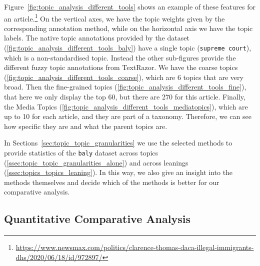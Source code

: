 Figure~\ref{fig:topic_analysis_different_tools} shows an example of these features for an article.\footnote{\url{https://www.newsmax.com/politics/clarence-thomas-daca-illegal-immigrants-dhs/2020/06/18/id/972897/}}
On the vertical axes, we have the topic weights given by the corresponding annotation method, while on the horizontal axis we have the topic labels.
The native topic annotations provided by the dataset (\ref{fig:topic_analysis_different_tools_baly}) have a single topic (\texttt{supreme court}), which is a non-standardised topic.
%
Instead the other sub-figures provide the different fuzzy topic annotations from TextRazor.
We have the coarse topics (\ref{fig:topic_analysis_different_tools_coarse}), which are 6 topics that are very broad. Then the fine-grained topics (\ref{fig:topic_analysis_different_tools_fine}), that here we only display the top 60, but there are 270 for this article.
Finally, the Media Topics (\ref{fig:topic_analysis_different_tools_mediatopics}), which are up to 10 for each article, and they are part of a taxonomy.  Therefore, we can see how specific they are and what the parent topics are.


In Sections~\ref{sec:topic_topic_granularities} we use the selected methods to provide statistics of the \texttt{baly} dataset across topics (\ref{ssec:topic_topic_granularities_alone}) and across leanings (\ref{ssec:topics_topics_leaning}). In this way, we also give an insight into the methods themselves and decide which of the methods is better for our comparative analysis.

\subsection{\statusgreen Quantitative Comparative Analysis}
\label{sec:topic_method_comparative}

